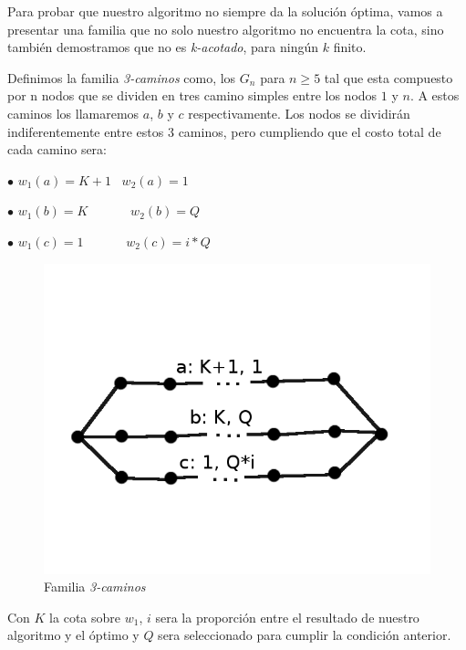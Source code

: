 Para probar que nuestro algoritmo no siempre da la solución óptima, vamos a presentar una familia que no solo nuestro algoritmo no encuentra la cota, sino también demostramos que no es \emph{k-acotado}, para ningún $k$ finito.


Definimos la familia \emph{3-caminos} como, los $G_n$ para $n \geq 5$ tal que esta compuesto por n nodos que se dividen en tres camino simples entre los nodos $1$ y $n$. A estos caminos los llamaremos $a$, $b$ y $c$ respectivamente. Los nodos se dividirán indiferentemente entre estos 3 caminos, pero cumpliendo que el costo total de cada camino sera:

$\bullet$ $w_1(a) = K+1$ \ $w_2(a)=1$

$\bullet$ $w_1(b) = K$  \ \ \ \ \ \ $w_2(b)=Q$

$\bullet$ $w_1(c) = 1$ \ \ \ \ \ \   $w_2(c)=i*Q$


\begin{figure}[H]
  \begin{center}
  \begin{minipage}{0.5\linewidth}
    \includegraphics[width=\linewidth]{graficos/grafoFamiliaRompe.png}
    \caption{Familia \emph{3-caminos}}\label{fig:familia1}
  \end{minipage}
  \end{center}
\end{figure}

Con $K$ la cota sobre $w_1$, $i$ sera la proporción entre el resultado de nuestro algoritmo y el óptimo y $Q$ sera seleccionado para cumplir la condición anterior.

